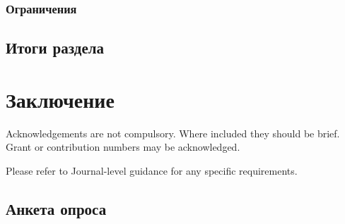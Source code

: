 \documentclass[pdflatex,sn-mathphys-num]{sn-jnl}%
\theoremstyle{thmstyleone}%
\theoremstyle{thmstyletwo}%
\theoremstyle{thmstylethree}%
\begin{document}
\subsubsection{Ограничения}

\subsection{Итоги раздела}

\section{Заключение}\label{sec6}

\backmatter


Acknowledgements are not compulsory. Where included they should be brief. Grant or contribution numbers may be acknowledged.

Please refer to Journal-level guidance for any specific requirements.

\begin{appendices}

\section{Анкета опроса}\label{secA1}





\end{appendices}


\end{document}
